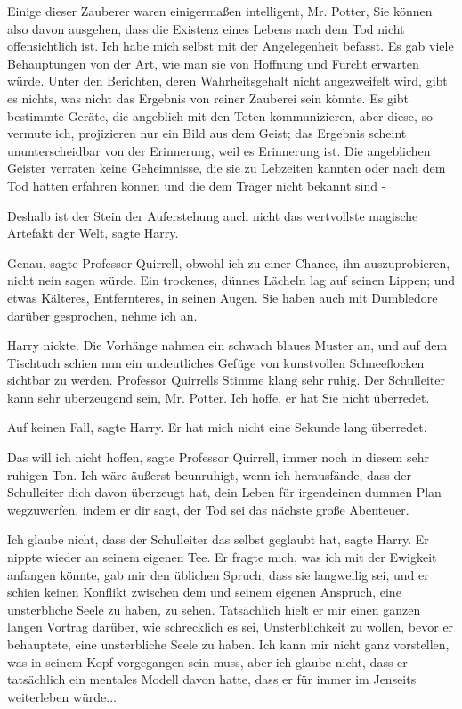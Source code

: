 \glqq{}Einige dieser Zauberer waren einigermaßen intelligent, Mr. Potter, Sie
können also davon ausgehen, dass die Existenz eines Lebens nach dem Tod nicht
offensichtlich ist. Ich habe mich selbst mit der Angelegenheit befasst. Es gab
viele Behauptungen von der Art, wie man sie von Hoffnung und Furcht erwarten
würde. Unter den Berichten, deren Wahrheitsgehalt nicht angezweifelt wird, gibt
es nichts, was nicht das Ergebnis von reiner Zauberei sein könnte. Es gibt
bestimmte Geräte, die angeblich mit den Toten kommunizieren, aber diese, so
vermute ich, projizieren nur ein Bild aus dem Geist; das Ergebnis scheint
ununterscheidbar von der Erinnerung, weil es Erinnerung ist. Die angeblichen
Geister verraten keine Geheimnisse, die sie zu Lebzeiten kannten oder nach dem
Tod hätten erfahren können und die dem Träger nicht bekannt sind -\grqq{}

\glqq{}Deshalb ist der Stein der Auferstehung auch nicht das wertvollste magische
Artefakt der Welt\grqq{}, sagte Harry.

\glqq{}Genau\grqq{}, sagte Professor Quirrell, \glqq{}obwohl ich zu einer Chance,
ihn auszuprobieren, nicht nein sagen würde.\grqq{} Ein trockenes, dünnes Lächeln lag
auf seinen Lippen; und etwas Kälteres, Entfernteres, in seinen Augen. \glqq{}Sie
haben auch mit Dumbledore darüber gesprochen, nehme ich an.\grqq{}

Harry nickte. Die Vorhänge nahmen ein schwach blaues Muster an, und auf dem
Tischtuch schien nun ein undeutliches Gefüge von kunstvollen Schneeflocken
sichtbar zu werden. Professor Quirrells Stimme klang sehr ruhig. \glqq{}Der
Schulleiter kann sehr überzeugend sein, Mr. Potter. Ich hoffe, er hat Sie nicht
überredet.\grqq{}

\glqq{}Auf keinen Fall\grqq{}, sagte Harry. \glqq{}Er hat mich nicht eine Sekunde
lang überredet.\grqq{}

\glqq{}Das will ich nicht hoffen\grqq{}, sagte Professor Quirrell, immer noch in
diesem sehr ruhigen Ton. \glqq{}Ich wäre äußerst beunruhigt, wenn ich
herausfände, dass der Schulleiter dich davon überzeugt hat, dein Leben für
irgendeinen dummen Plan wegzuwerfen, indem er dir sagt, der Tod sei das nächste
große Abenteuer.\grqq{}

\glqq{}Ich glaube nicht, dass der Schulleiter das selbst geglaubt hat\grqq{},
sagte Harry. Er nippte wieder an seinem eigenen Tee. \glqq{}Er fragte mich, was
ich mit der Ewigkeit anfangen könnte, gab mir den üblichen Spruch, dass sie
langweilig sei, und er schien keinen Konflikt zwischen dem und seinem eigenen
Anspruch, eine unsterbliche Seele zu haben, zu sehen. Tatsächlich hielt er mir
einen ganzen langen Vortrag darüber, wie schrecklich es sei, Unsterblichkeit zu
wollen, bevor er behauptete, eine unsterbliche Seele zu haben. Ich kann mir
nicht ganz vorstellen, was in seinem Kopf vorgegangen sein muss, aber ich glaube
nicht, dass er tatsächlich ein mentales Modell davon hatte, dass er für immer im
Jenseits weiterleben würde...\grqq{}

